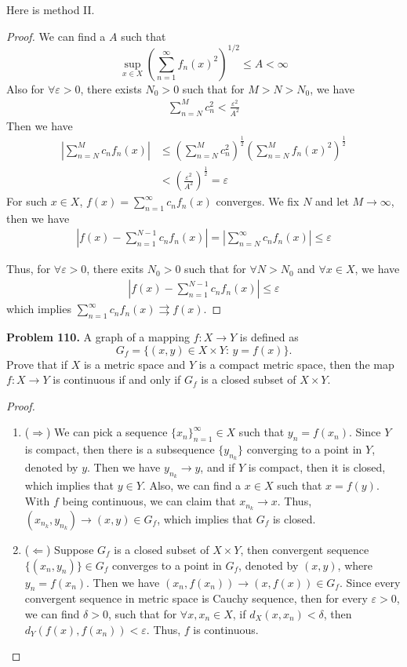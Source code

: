 \documentclass[12pt,leqno]{amsart}
\theoremstyle{definition}
\numberwithin{equation}{subsection}
\begin{document}
Here is method II.
\begin{proof}
We can find a $A$ such that 
$$\sup_{x\in X}\left(\sum_{n=1}^\infty f_n(x)^2\right)^{1/2} \leq A < \infty$$
Also for $\forall \varepsilon > 0$, there exists $N_0 > 0$ such that for $M > N > N_0$, we have 
\begin{align*}
    \sum^M_{n = N}c_n^2 < \frac{\varepsilon^2}{A^2}
\end{align*}
Then we have
\begin{align*}
    \left|\sum^M_{n = N}c_n f_n(x) \right| & \leq \left(\sum^M_{n = N}c_n^2\right)^{\frac{1}{2}} \left(\sum^M_{n = N}f_n(x)^2\right)^{\frac{1}{2}} \\
    & < \left(\frac{\varepsilon^2}{A^2}\right)^{\frac{1}{2}} = \varepsilon
\end{align*}
For such $x\in X$, $f(x)  = \sum^\infty_{n = 1}c_n f_n(x)$ converges. We fix $N$ and let $M\to\infty$, then we have
\begin{align*}
    \left|f(x) - \sum^{N-1}_{n = 1}c_n f_n(x) \right| = \left|\sum^{\infty}_{n = N}c_n f_n(x) \right| \leq \varepsilon
\end{align*}

Thus, for $\forall\varepsilon > 0$, there exits $N_0 > 0$ such that for $\forall N > N_0$ and $\forall x\in X$, we have 
\begin{align*}
    \left|f(x) - \sum^{N-1}_{n = 1}c_n f_n(x) \right| \leq \varepsilon
\end{align*}
which implies $\sum^\infty_{n=1}c_n f_n(x) \rightrightarrows f(x)$. 
\end{proof}

\medskip

\noindent
{\bf Problem 110.}
A graph of a mapping $f:X\to Y$ is defined as
$$
G_f=\{ (x,y)\in X\times Y:\, y=f(x)\}.
$$
Prove that if $X$ is a metric space and $Y$ is a compact metric space, then the map $f:X\to Y$ is continuous if and only if $G_f$ is a closed subset of $X\times Y$.
\begin{proof}
~\begin{enumerate}
    \item ($\Rightarrow$) We can pick a sequence $\{x_n\}^\infty_{n=1}\in X$ such that $y_n = f(x_n)$. Since $Y$ is compact, then there is a subsequence $\{y_{n_k}\}$ converging to a point in $Y$, denoted by $y$. Then we have $y_{n_k}\to y$, and if $Y$ is compact, then it is closed, which implies that $y\in Y$. Also, we can find a $x\in X$ such that $x = f(y)$. With $f$ being continuous, we can claim that $x_{n_k}\to x$. Thus, $\left(x_{n_k},y_{n_k}\right)\to(x,y)\in G_f$, which implies that $G_f$ is closed.
    \item ($\Leftarrow$) Suppose  $G_f$ is a closed subset of $X\times Y$, then convergent sequence $\{\left(x_n, y_n\right)\}\in G_f$ converges to a point in $G_f$, denoted by $(x,y)$, where $y_n = f(x_n)$. Then we have $\left(x_n, f(x_n)\right) \to (x,f(x))\in G_f$. Since every convergent sequence in metric space is Cauchy sequence, then for every $\varepsilon > 0$, we can find $\delta > 0$, such that for $\forall x, x_n \in X$, if $d_X(x,x_n) < \delta$, then  $d_Y(f(x),f(x_n)) < \varepsilon$. Thus, $f$ is continuous.
\end{enumerate}
\end{proof}
\end{document}
